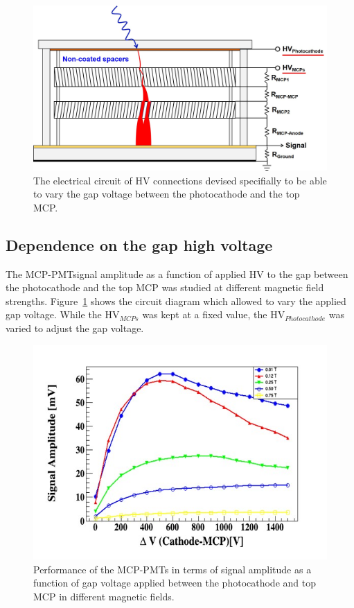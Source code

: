 \documentclass[preprint,5p]{elsarticle}
\begin{document}
\begin{figure}[tbp]
\centering \includegraphics[scale=0.32]{fig/Figure7.jpg}
\caption{The electrical circuit of HV connections devised specifially to be able to vary the gap voltage 
   between the photocathode and the top MCP.} \label{fig:7}
\end{figure}


\subsection{Dependence on the gap high voltage} \label{}
The MCP-PMTsignal amplitude as a function of applied HV to the gap between the 
photocathode and the top MCP was studied at different magnetic field 
strengths. Figure~\ref{fig:7} shows the circuit diagram which allowed to vary the applied gap 
voltage. While the HV$_{MCPs}$ 
was kept at a fixed value, the HV$_{Photocathode}$ was varied to adjust the gap voltage. 

\begin{figure}[tbp]
\centering \includegraphics[scale=0.6]{fig/Figure8.jpg}
\caption{Performance of the MCP-PMTs in terms of signal amplitude as a function 
   of gap voltage applied between the photocathode and top MCP in different 
   magnetic fields.} \label{fig:8}
\end{figure} 
\end{document}
